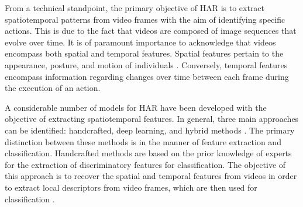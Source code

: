 \documentclass[mathematics,article,submit,pdftex,moreauthors]{Definitions/mdpi}
\begin{document}

From a technical standpoint, the primary objective of HAR is to extract spatiotemporal patterns from video frames with the aim of identifying specific actions. This is due to the fact that videos are composed of image sequences that evolve over time. It is of paramount importance to acknowledge that videos encompass both spatial and temporal features. Spatial features pertain to the appearance, posture, and motion of individuals \cite{s19051005}. Conversely, temporal features encompass information regarding changes over time between each frame during the execution of an action. 

A considerable number of models for HAR have been developed with the objective of extracting spatiotemporal features. In general, three main approaches can be identified: handcrafted, deep learning, and hybrid methods \cite{s23042182}. The primary distinction between these methods is in the manner of feature extraction and classification. 
Handcrafted methods are based on the prior knowledge of experts for the extraction of discriminatory features for classification. The objective of this approach is to recover the spatial and temporal features from videos in order to extract local descriptors from video frames, which are then used for classification \cite{Beddiar2020}. 
\end{document}
